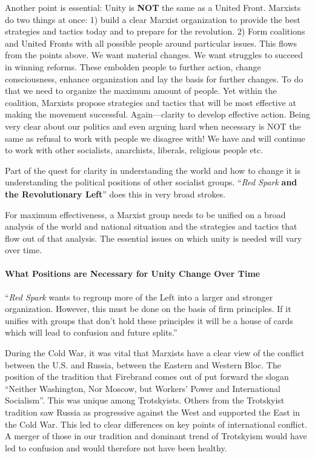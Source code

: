 Another point is essential: Unity is \textbf{NOT} the same as a United Front. Marxists do two things at once: 1) build a clear Marxist organization to provide the best strategies and tactics today and to prepare for the revolution. 2) Form coalitions and United Fronts with all possible people around particular issues. This flows from the points above. We want material changes. We want struggles to succeed in winning reforms. These embolden people to further action, change consciousness, enhance organization and lay the basis for further changes. To do that we need to organize the maximum amount of people. Yet within the coalition, Marxists propose strategies and tactics that will be most effective at making the movement successful. Again---clarity to develop effective action. Being very clear about our politics and even arguing hard when necessary is NOT the same as refusal to work with people we disagree with! We have and will continue to work with other socialists, anarchists, liberals, religious people etc.

Part of the quest for clarity in understanding the world and how to change it is understanding the political positions of other socialist groups. ``\emph{Red Spark} \textbf{and the Revolutionary Left}'' does this in very broad strokes.

For maximum effectiveness, a Marxist group needs to be unified on a broad analysis of the world and national situation and the strategies and tactics that flow out of that analysis. The essential issues on which unity is needed will vary over time.

\paragraph{What Positions are Necessary for Unity Change Over Time}

``\emph{Red Spark} wants to regroup more of the Left into a larger and stronger organization. However, this must be done on the basis of firm principles. If it unifies with groups that don't hold these principles it will be a house of cards which will lead to confusion and future splits.''

During the Cold War, it was vital that Marxists have a clear view of the conflict between the U.S. and Russia, between the Eastern and Western Bloc. The position of the tradition that Firebrand comes out of put forward the slogan ``Neither Washington, Nor Moscow, but Workers' Power and International Socialism''. This was unique among Trotskyists. Others from the Trotskyist tradition saw Russia as progressive against the West and supported the East in the Cold War. This led to clear differences on key points of international conflict. A merger of those in our tradition and dominant trend of Trotskyism would have led to confusion and would therefore not have been healthy.

